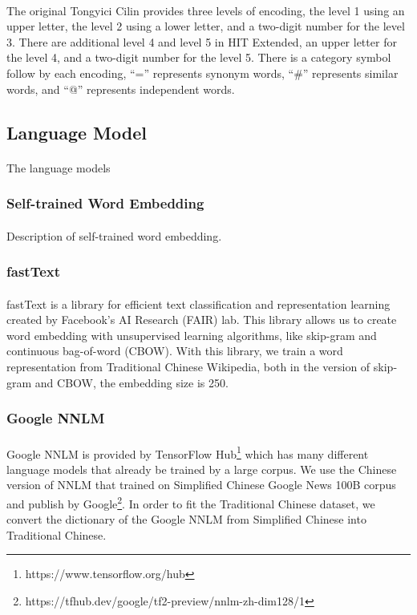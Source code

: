 \documentclass[12pt]{article}
\begin{document}
\begin{CJK*}{UTF8}{bkai}
\begin{spacing}{1.77}
\paragraph{}
The original Tongyici Cilin provides three levels of encoding, the level 1 using an upper letter, the level 2 using a lower letter, and a two-digit number for the level 3. There are additional level 4 and level 5 in HIT Extended, an upper letter for the level 4, and a two-digit number for the level 5. There is a category symbol follow by each encoding, ``='' represents synonym words, ``\#'' represents similar words, and ``@'' represents independent words.

\subsection{Language Model}
\paragraph{}
The language models

\subsubsection{Self-trained Word Embedding}
\paragraph{}
Description of self-trained word embedding.

\subsubsection{fastText}
\paragraph{}
fastText\cite{bojanowski2016enriching} is a library for efficient text classification and representation learning created by Facebook's AI Research (FAIR) lab. This library allows us to create word embedding with unsupervised learning algorithms, like skip-gram and continuous bag-of-word (CBOW). With this library, we train a word representation from Traditional Chinese Wikipedia, both in the version of skip-gram and CBOW, the embedding size is 250.

\subsubsection{Google NNLM}
\paragraph{}
Google NNLM is provided by TensorFlow Hub\footnote{https://www.tensorflow.org/hub} which has many different language models that already be trained by a large corpus. We use the Chinese version of NNLM that trained on Simplified Chinese Google News 100B corpus and publish by Google\footnote{https://tfhub.dev/google/tf2-preview/nnlm-zh-dim128/1}. In order to fit the Traditional Chinese dataset, we convert the dictionary of the Google NNLM from Simplified Chinese into Traditional Chinese.


\end{spacing}
\end{CJK*}
\end{document}
